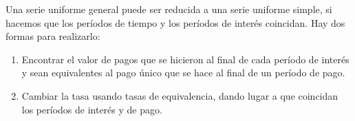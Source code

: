 Una serie uniforme general puede ser reducida a una serie uniforme simple, si hacemos que los períodos de tiempo y los períodos de interés coincidan. Hay dos formas para realizarlo:\\

\begin{enumerate}
	\item Encontrar el valor de pagos que se hicieron al final de cada período de interés y sean equivalentes al pago único que se hace al final de un período de pago.
	\item Cambiar la tasa usando tasas de equivalencia, dando lugar a que coincidan los períodos de interés y de pago.\\
\end{enumerate}





















